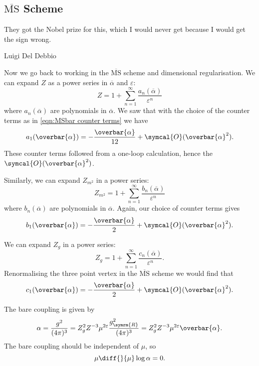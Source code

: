 \documentclass[fleqn]{NotesClass}
\newcommand*{\MSbar}{\ensuremath{\overline{\text{MS}}}}
\newcommand{\order}{\symcal{O}}
\newcommand{\renormalised}{\symrm{R}}
\begin{document}
    \subsection{\texorpdfstring{\MSbar{}}{MS bar} Scheme}
    \epigraph{They got the Nobel prize for this, which I would never get because I would get the sign wrong.}{Luigi Del Debbio}
    Now we go back to working in the \MSbar{} scheme and dimensional regularisation.
    We can expand \(Z\) as a power series in \(\overbar{\alpha}\) and \(\varepsilon\):
    \begin{equation}
        Z = 1 + \sum_{n = 1}^{\infty} \frac{a_n(\overbar{\alpha})}{\varepsilon^n}
    \end{equation}
    where \(a_n(\overbar{\alpha})\) are polynomials in \(\overbar{\alpha}\).
    We saw that with the choice of the counter terms as in \cref{eqn:MSbar counter terms} we have
    \begin{equation}
        a_1(\overbar{\alpha}) = -\frac{\overbar{\alpha}}{12} + \order(\overbar{\alpha}^2).
    \end{equation}
    These counter terms followed from a one-loop calculation, hence the \(\order(\overbar{\alpha}^2)\).
    
    Similarly, we can expand \(Z_{m^2}\) in a power series:
    \begin{equation}
        Z_{m^2} = 1 + \sum_{n = 1}^{\infty} \frac{b_n(\overbar{\alpha})}{\varepsilon^n}
    \end{equation}
    where \(b_n(\overbar{\alpha})\) are polynomials in \(\overbar{\alpha}\).
    Again, our choice of counter terms gives
    \begin{equation}
        b_1(\overbar{\alpha}) = -\frac{\overbar{\alpha}}{2} + \order(\overbar{\alpha}^2).
    \end{equation}
    
    We can expand \(Z_g\) in a power series:
    \begin{equation}
        Z_g = 1 + \sum_{n=1}^{\infty} \frac{c_n(\overbar{\alpha})}{\varepsilon^n}.
    \end{equation}
    Renormalising the three point vertex in the \MSbar{} scheme we would find that
    \begin{equation}
        c_1(\overbar{\alpha}) = -\frac{\overbar{\alpha}}{2} + \order(\overbar{\alpha}^2).
    \end{equation}
    
    The bare coupling is given by
    \begin{equation}
        \alpha = \frac{g^2}{(4\pi)^3} = Z_g^2 Z^{-3}\mu^{2\varepsilon} \frac{g_{\renormalised}^2}{(4\pi)^3} = Z_g^2 Z^{-3}\mu^{2\varepsilon} \overbar{\alpha}.
    \end{equation}
    The bare coupling should be independent of \(\mu\), so
    \begin{equation}
        \mu \diff{}{\mu} \log \alpha = 0.
    \end{equation}
\end{document}
